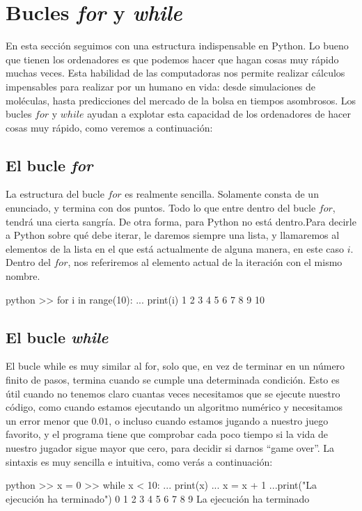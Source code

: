 \documentclass{article}
\begin{document}
\section{Bucles \textit{for} y \textit{while}}
En esta sección seguimos con una estructura indispensable en Python. Lo bueno que tienen los ordenadores es que podemos hacer que hagan cosas muy rápido muchas veces. Esta habilidad de las computadoras nos permite realizar cálculos impensables para realizar por un humano en vida: desde simulaciones de moléculas, hasta predicciones del mercado de la bolsa en tiempos asombrosos. Los bucles $for$ y $while$ ayudan a explotar esta capacidad de los ordenadores de hacer cosas muy rápido, como veremos a continuación:

\subsection{El bucle \textit{for}}

La estructura del bucle $for$ es realmente sencilla. Solamente consta de un enunciado, y termina con dos puntos. Todo lo que entre dentro del bucle $for$, tendrá una cierta sangría. De otra forma, para Python no está dentro.Para decirle a Python sobre qué debe iterar, le daremos siempre una lista, y llamaremos al elementos de la lista en el que está actualmente de alguna manera, en este caso $i$. Dentro del $for$, nos referiremos al elemento actual de la iteración con el mismo nombre.

\begin{mintedbox}{python}
>> for i in range(10):
...     print(i)
1
2
3
4
5
6
7
8
9
10
\end{mintedbox}
\subsection{El bucle \textit{while}}
El bucle while es muy similar al for, solo que, en vez de terminar en un número finito de pasos, termina cuando se cumple una determinada condición. Esto es útil cuando no tenemos claro cuantas veces necesitamos que se ejecute nuestro código, como cuando estamos ejecutando un algoritmo numérico y necesitamos un error menor que $0.01$, o incluso cuando estamos jugando a nuestro juego favorito, y el programa tiene que comprobar cada poco tiempo si la vida de nuestro jugador sigue mayor que cero, para decidir si darnos ``game over''. La sintaxis es muy sencilla e intuitiva, como verás a continuación:
\begin{mintedbox}{python}
>> x = 0
>> while x < 10:
...     print(x)
...     x = x + 1
...print("La ejecución ha terminado")
0
1
2
3
4
5
6
7
8
9
La ejecución ha terminado
\end{mintedbox}
\end{document}
